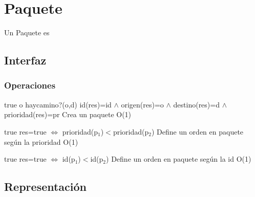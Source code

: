 \section{Paquete}

Un Paquete es

\subsection{Interfaz}



\subsubsection*{Operaciones}

 {true o haycamino?(o,d)}
 {id(res)=id $\land$ origen(res)=o $\land$ destino(res)=d $\land$ prioridad(res)=pr}
 {Crea un paquete}
 {O(1)}
 {} 
 
 {true}
 {res=true $\iff$ prioridad(p$_1$)$<$prioridad(p$_2$)}
 {Define un orden en paquete seg\'un la prioridad}
 {O(1)}
 {}
 
 {true}
 {res=true $\iff$ id(p$_1$)$<$id(p$_2$)}
 {Define un orden en paquete seg\'un la id}
 {O(1)}
 {}
 
\subsection{Representación}

 